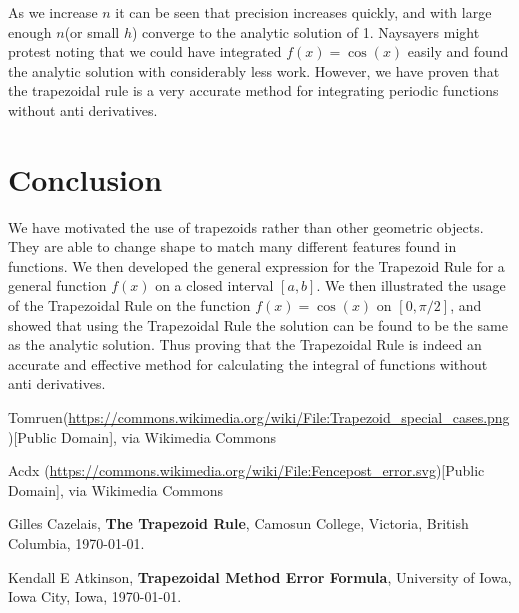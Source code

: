 \documentclass[10pt, reqno]{article}
\numberwithin{equation}{section}
\numberwithin{figure}{section}
\begin{document}
\begin{exmp}
\noindent As we increase $n$ it can be seen that precision increases quickly, and with large enough $n$(or small $h$) converge to the analytic solution of 1. Naysayers might protest noting that we could have integrated $f(x) = \cos(x)$ easily and found the analytic solution with considerably less work. However, we have proven that the trapezoidal rule is a very accurate method for integrating periodic functions without anti derivatives. 

\end{exmp}


\section{Conclusion}

We have motivated the use of trapezoids rather than other geometric objects. They are able to change shape to match many different features found in functions. We then developed the general expression for the Trapezoid Rule for a general function $f(x)$ on a closed interval $[a,b]$. We then illustrated the usage of the Trapezoidal Rule on the function $f(x) = \cos(x)$ on $[0,\pi/2]$, and showed that using the Trapezoidal Rule the solution can be found to be the same as the analytic solution. Thus proving that the Trapezoidal Rule is indeed an accurate and effective method for calculating the integral of functions without anti derivatives. 



\begin{thebibliography}{XX}

Tomruen(\url{https://commons.wikimedia.org/wiki/File:Trapezoid_special_cases.png})[Public Domain], via Wikimedia Commons

Acdx (\url{https://commons.wikimedia.org/wiki/File:Fencepost_error.svg})[Public Domain], via Wikimedia Commons

Gilles Cazelais, \textbf{The Trapezoid Rule}, Camosun College, Victoria, British Columbia, \today. 

Kendall E Atkinson, \textbf{Trapezoidal Method Error Formula}, University of Iowa, Iowa City, Iowa, \today.
\end{thebibliography} 
\end{document}
